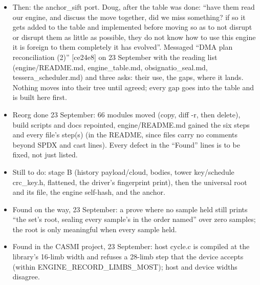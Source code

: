 \begin{itemize}
\item Then: the anchor\_\allowbreak{}sift port. Doug, after the table was done: “have them read our engine, and discuss the move together, did we miss something? if so it gets added to the table and implemented before moving so as to not disrupt or disrupt them as little as possible, they do not know how to use this engine it is foreign to them completely it has evolved”. Messaged “DMA plan reconciliation (2)” [ce24e8] on 23 September with the reading list (engine/README.md, engine\_\allowbreak{}table.md, obsignatio\_\allowbreak{}seal.md, tessera\_\allowbreak{}scheduler.md) and three asks: their use, the gaps, where it lands. Nothing moves into their tree until agreed; every gap goes into the table and is built here first.
\item Reorg done 23 September: 66 modules moved (copy, diff -r, then delete), build scripts and docs repointed, engine/README.md gained the six steps and every file's step(s) (in the README, since files carry no comments beyond SPDX and cast lines). Every defect in the “Found” lines is to be fixed, not just listed.
\item Still to do: stage B (history payload/cloud, bodies, tower key/schedule crc\_\allowbreak{}key.h, flattened, the driver's fingerprint print), then the universal root and its file, the engine self-hash, and the anchor.
\item Found on the way, 23 September: a prove where no sample held still prints “the set's root, sealing every sample's in the order named” over zero samples; the root is only meaningful when every sample held.
\item Found in the CASMI project, 23 September: host cycle.c is compiled at the library's 16-limb width and refuses a 28-limb step that the device accepts (within ENGINE\_\allowbreak{}RECORD\_\allowbreak{}LIMBS\_\allowbreak{}MOST); host and device widths disagree.
\end{itemize}

